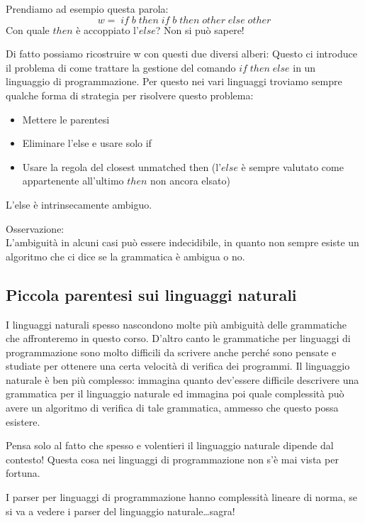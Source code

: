 \documentclass[class=book, crop=false, oneside]{standalone}
\begin{document}
Prendiamo ad esempio questa parola:
\begin{equation}
    w =\; if\; b\; then\; if\; b\; then\; other\; else\; other
\end{equation}
Con quale $then$ è accoppiato l’$else$? Non si può sapere!

Di fatto possiamo ricostruire w con questi due diversi alberi:
Questo ci introduce il problema di come trattare la gestione del comando $if \; then \; else$ in un linguaggio di programmazione. 
Per questo nei vari linguaggi troviamo sempre qualche forma di strategia per risolvere questo problema:
\begin{itemize}
    \item Mettere le parentesi
    \item Eliminare l’else e usare solo if
    \item Usare la regola del closest unmatched then (l’$else$ è sempre valutato come appartenente all’ultimo $then$ non ancora elsato)
\end{itemize}	
L’else è intrinsecamente ambiguo.

Osservazione:\\
L’ambiguità in alcuni casi può essere indecidibile, in quanto non sempre esiste un algoritmo che ci dice se la grammatica è ambigua o no.

\subsection{Piccola parentesi sui linguaggi naturali}
I linguaggi naturali spesso nascondono molte più ambiguità delle grammatiche che affronteremo in questo corso.
D'altro canto le grammatiche per linguaggi di programmazione sono molto difficili da scrivere anche perché sono pensate e studiate per ottenere una certa velocità di verifica dei programmi.
Il linguaggio naturale è ben più complesso: immagina quanto dev’essere difficile descrivere una grammatica per il linguaggio naturale ed immagina poi quale complessità può avere un algoritmo di verifica di tale grammatica, ammesso che questo possa esistere.

Pensa solo al fatto che spesso e volentieri il linguaggio naturale dipende dal contesto! Questa cosa nei linguaggi di programmazione non s’è mai vista per fortuna.

I parser per linguaggi di programmazione hanno complessità lineare di norma, se si va a vedere i parser del linguaggio naturale\dots sagra!
\end{document}
